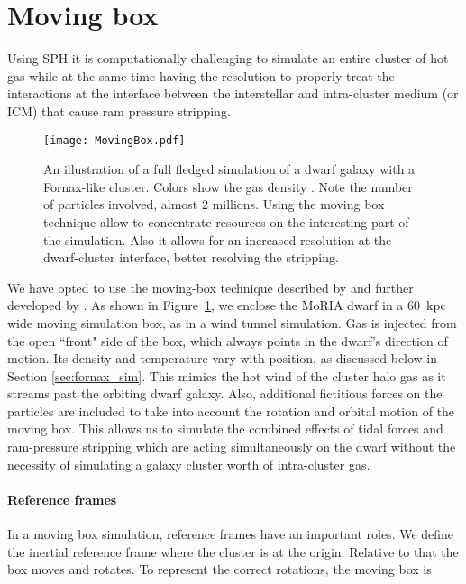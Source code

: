 \section{Moving box}

Using SPH it is computationally challenging to simulate an entire cluster of hot gas while at the same time having the resolution to properly treat the interactions at the interface between the interstellar and intra-cluster medium (or ICM) that cause ram pressure stripping.

\begin{figure}[h]
 \centering
 \texttt{[image: MovingBox.pdf]}
 \caption{An illustration of a full fledged simulation of a dwarf galaxy with a Fornax-like cluster. Colors show the gas density \citep[using the \texttt{glnemo2} software][]{Lambert2012}. Note the number of particles involved, almost 2 millions.
 Using the moving box technique allow to concentrate resources on the interesting part of the simulation. Also it allows for an increased resolution at the dwarf-cluster interface, better resolving the stripping.}
 \label{fig:MovingBox}
\end{figure}

We have opted to use the moving-box technique described by \citet{Nichols2015} and further developed by \citet{Hausammann2019}.
As shown in Figure~\ref{fig:MovingBox}, we enclose the MoRIA dwarf in a $60$~kpc wide moving simulation box, as in a wind tunnel simulation.
Gas is injected from the open ``front" side of the box, which always points in the dwarf's direction of motion. Its density and temperature vary with position, as discussed below in Section \ref{sec:fornax_sim}.
This mimics the hot wind of the cluster halo gas as it streams past the orbiting dwarf galaxy.
Also, additional fictitious forces on the particles are included to take into account the rotation and orbital motion of the moving box.
This allows us to simulate the combined effects of tidal forces and ram-pressure stripping \citep[as studied by][]{Mayer2006} which are acting simultaneously on the dwarf without the necessity of simulating a galaxy cluster worth of intra-cluster gas.

\paragraph{Reference frames} In a moving box simulation, reference frames have an important roles.
We define the inertial reference frame where the cluster is at the origin.
Relative to that the box moves and rotates.
To represent the correct rotations, the moving box is 

